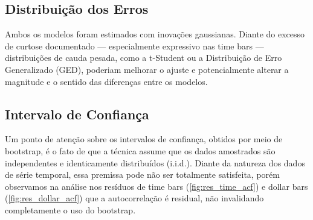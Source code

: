 \subsection{Distribuição dos Erros}
\label{subsec:lim_distribuicao}

Ambos os modelos foram estimados com inovações gaussianas. Diante do excesso de curtose
documentado --- especialmente expressivo nas time bars --- distribuições de cauda pesada,
como a t-Student ou a Distribuição de Erro Generalizado (GED), poderiam melhorar o ajuste
e potencialmente alterar a magnitude e o sentido das diferenças entre os modelos.

\subsection{Intervalo de Confiança}
\label{subsec: ic_bootstrap}

Um ponto de atenção sobre os intervalos de confiança, obtidos por meio de bootstrap, é o fato de que a técnica assume que os dados amostrados são independentes e identicamente distribuídos (i.i.d.). Diante da natureza dos dados de série temporal, essa premissa pode não ser totalmente satisfeita, porém observamos na análise nos resíduos de time bars (\autoref{fig:res_time_acf}) e dollar bars (\autoref{fig:res_dollar_acf}) que a autocorrelação é residual, não invalidando completamente o uso do bootstrap.